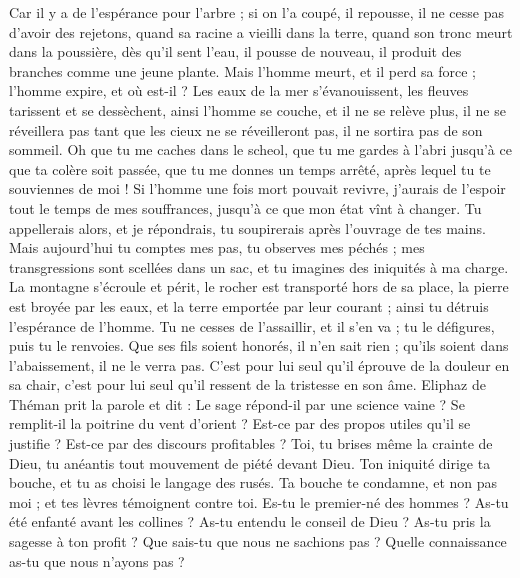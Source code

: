 \begin{multicols}{2}
Car il y a de l'espérance pour l'arbre ; si on l'a coupé, il repousse, il ne cesse pas d'avoir des rejetons,
quand sa racine a vieilli dans la terre, quand son tronc meurt dans la poussière,
dès qu'il sent l'eau, il pousse de nouveau, il produit des branches comme une jeune plante.
Mais l'homme meurt, et il perd sa force ; l'homme expire, et où est-il ?
Les eaux de la mer s'évanouissent, les fleuves tarissent et se dessèchent,
ainsi l'homme se couche, et il ne se relève plus, il ne se réveillera pas tant que les cieux ne se réveilleront pas, il ne sortira pas de son sommeil.
Oh que tu me caches dans le scheol, que tu me gardes à l'abri jusqu'à ce que ta colère soit passée, que tu me donnes un temps arrêté, après lequel tu te souviennes de moi !
Si l'homme une fois mort pouvait revivre, j'aurais de l'espoir tout le temps de mes souffrances, jusqu'à ce que mon état vînt à changer.
Tu appellerais alors, et je répondrais, tu soupirerais après l'ouvrage de tes mains.
Mais aujourd'hui tu comptes mes pas, tu observes mes péchés ;
mes transgressions sont scellées dans un sac, et tu imagines des iniquités à ma charge.
La montagne s'écroule et périt, le rocher est transporté hors de sa place,
la pierre est broyée par les eaux, et la terre emportée par leur courant ; ainsi tu détruis l'espérance de l'homme.
Tu ne cesses de l'assaillir, et il s'en va ; tu le défigures, puis tu le renvoies.
Que ses fils soient honorés, il n'en sait rien ; qu'ils soient dans l'abaissement, il ne le verra pas.
C'est pour lui seul qu'il éprouve de la douleur en sa chair, c'est pour lui seul qu'il ressent de la tristesse en son âme.
\VerseOne{}Eliphaz de Théman prit la parole et dit :
Le sage répond-il par une science vaine ? Se remplit-il la poitrine du vent d'orient ?
Est-ce par des propos utiles qu'il se justifie ? Est-ce par des discours profitables ?
Toi, tu brises même la crainte de Dieu, tu anéantis tout mouvement de piété devant Dieu.
Ton iniquité dirige ta bouche, et tu as choisi le langage des rusés.
Ta bouche te condamne, et non pas moi ; et tes lèvres témoignent contre toi.
Es-tu le premier-né des hommes ? As-tu été enfanté avant les collines ?
As-tu entendu le conseil de Dieu ? As-tu pris la sagesse à ton profit ?
Que sais-tu que nous ne sachions pas ? Quelle connaissance as-tu que nous n'ayons pas ?

\end{multicols}
